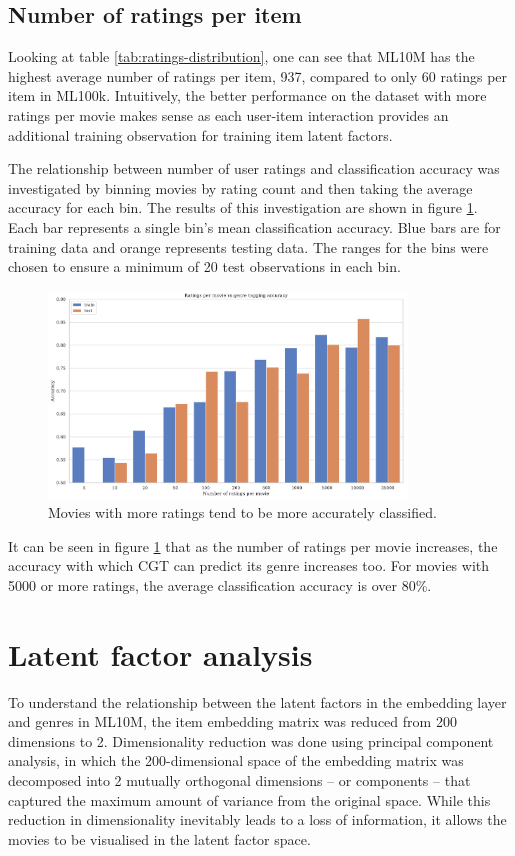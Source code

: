 \subsection{Number of ratings per item}
Looking at table \ref{tab:ratings-distribution}, one can see that ML10M has the highest average number of ratings per item, 937, compared to only 60 ratings per item in ML100k. Intuitively, the better performance on the dataset with more ratings per movie makes sense as each user-item interaction provides an additional training observation for training item latent factors.

The relationship between number of user ratings and classification accuracy was investigated by binning movies by rating count and then taking the average accuracy for each bin. The results of this investigation are shown in figure \ref{fig:5-ratings-vs-acc}. Each bar represents a single bin's mean classification accuracy. Blue bars are for training data and orange represents testing data. The ranges for the bins were chosen to ensure a minimum of 20 test observations in each bin.

\begin{figure}[H]
\centering
\includegraphics[width=0.85\textwidth]{Figures/5_ml10m-ratings-vs-acc.pdf}
\decoRule
\caption[Number of ratings vs accuracy]{Movies with more ratings tend to be more accurately classified.}
\label{fig:5-ratings-vs-acc}
\end{figure}

It can be seen in figure \ref{fig:5-ratings-vs-acc} that as the number of ratings per movie increases, the accuracy with which CGT can predict its genre increases too. For movies with 5000 or more ratings, the average classification accuracy is over 80\%.

\section{Latent factor analysis}
To understand the relationship between the latent factors in the embedding layer and genres in ML10M, the item embedding matrix was reduced from 200 dimensions to 2. Dimensionality reduction was done using principal component analysis, in which the 200-dimensional space of the embedding matrix was decomposed into 2 mutually orthogonal dimensions -- or components -- that captured the maximum amount of variance from the original space. While this reduction in dimensionality inevitably leads to a loss of information, it allows the movies to be visualised in the latent factor space.

